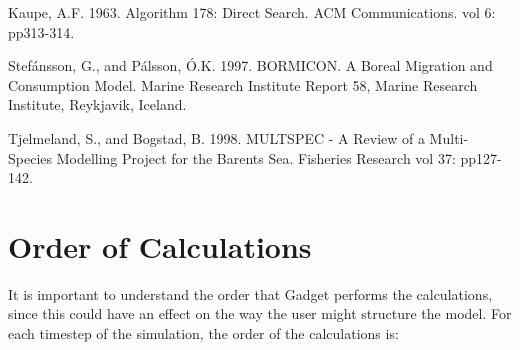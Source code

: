 \documentclass[]{book}
\begin{document}
Kaupe, A.F. 1963. Algorithm 178: Direct Search. ACM Communications. vol
6: pp313-314.

Stefánsson, G., and Pálsson, Ó.K. 1997. BORMICON. A Boreal Migration and
Consumption Model. Marine Research Institute Report 58, Marine Research
Institute, Reykjavik, Iceland.

Tjelmeland, S., and Bogstad, B. 1998. MULTSPEC - A Review of a
Multi-Species Modelling Project for the Barents Sea. Fisheries Research
vol 37: pp127-142.

\appendix

\hypertarget{chap:order}{%
\chapter{Order of Calculations}\label{chap:order}}

It is important to understand the order that Gadget performs the
calculations, since this could have an effect on the way the user might
structure the model. For each timestep of the simulation, the order of
the calculations is:
\end{document}
